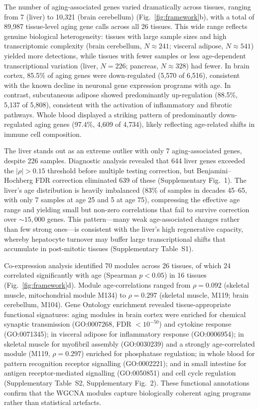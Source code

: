 \documentclass[11pt,a4paper]{article}
\begin{document}
The number of aging-associated genes varied dramatically across tissues, ranging from 7 (liver) to 10,321 (brain cerebellum) (Fig.~\ref{fig:framework}b), with a total of 89,987 tissue-level aging gene calls across all 26 tissues. This wide range reflects genuine biological heterogeneity: tissues with large sample sizes and high transcriptomic complexity (brain cerebellum, $N \approx 241$; visceral adipose, $N \approx 541$) yielded more detections, while tissues with fewer samples or less age-dependent transcriptional variation (liver, $N = 226$; pancreas, $N \approx 328$) had fewer. In brain cortex, 85.5\% of aging genes were down-regulated (5,570 of 6,516), consistent with the known decline in neuronal gene expression programs with age. In contrast, subcutaneous adipose showed predominantly up-regulation (88.5\%, 5,137 of 5,808), consistent with the activation of inflammatory and fibrotic pathways. Whole blood displayed a striking pattern of predominantly down-regulated aging genes (97.4\%, 4,609 of 4,734), likely reflecting age-related shifts in immune cell composition.

The liver stands out as an extreme outlier with only 7 aging-associated genes, despite 226 samples. Diagnostic analysis revealed that 644 liver genes exceeded the $|\rho| > 0.15$ threshold before multiple testing correction, but Benjamini--Hochberg FDR correction eliminated 639 of these (Supplementary Fig.~1). The liver's age distribution is heavily imbalanced (83\% of samples in decades 45--65, with only 7 samples at age 25 and 5 at age 75), compressing the effective age range and yielding small but non-zero correlations that fail to survive correction over ${\sim}15{,}000$ genes. This pattern---many weak age-associated changes rather than few strong ones---is consistent with the liver's high regenerative capacity, whereby hepatocyte turnover may buffer large transcriptional shifts that accumulate in post-mitotic tissues (Supplementary Table~S1).

Co-expression analysis identified 70 modules across 26 tissues, of which 24 correlated significantly with age (Spearman $p < 0.05$) in 16 tissues (Fig.~\ref{fig:framework}d). Module age-correlations ranged from $\rho = 0.092$ (skeletal muscle, mitochondrial module M134) to $\rho = 0.297$ (skeletal muscle, M119; brain cerebellum, M104). Gene Ontology enrichment revealed tissue-appropriate functional signatures: aging modules in brain cortex were enriched for chemical synaptic transmission (GO:0007268, FDR $< 10^{-50}$) and cytokine response (GO:0071345); in visceral adipose for inflammatory response (GO:0006954); in skeletal muscle for myofibril assembly (GO:0030239) and a strongly age-correlated module (M119, $\rho = 0.297$) enriched for phosphatase regulation; in whole blood for pattern recognition receptor signalling (GO:0002221); and in small intestine for antigen receptor-mediated signalling (GO:0050851) and cell cycle regulation (Supplementary Table~S2, Supplementary Fig.~2). These functional annotations confirm that the WGCNA modules capture biologically coherent aging programs rather than statistical artefacts.
\end{document}
